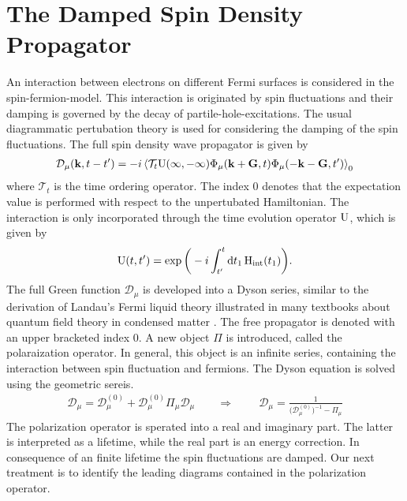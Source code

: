 \section{The Damped Spin Density Propagator}
\label{appsec:damped propagator}
%
%
An interaction between electrons on different Fermi surfaces is considered in the spin-fermion-model.
This interaction is originated by spin fluctuations and their damping is governed by the decay of partile-hole-excitations.
The usual diagrammatic pertubation theory is used for considering the damping of the spin fluctuations.
The full spin density wave propagator is given by
%
\begin{align}
	\mathcal{D}_{\mu}(\vb{k}, t-t') = -i \expval{\mathcal{T}_{t} \mathrm{U}(\infty, -\infty) \Phi_{\mu}(\vb{k}+\vb{G},t) \Phi_{\mu}(-\vb{k}-\vb{G},t')}_{0}
	\label{appeq:full spin density wave propagator}
\end{align}
%
where $\mathcal{T}_{t}$ is the time ordering operator.
The index $0$ denotes that the expectation value is performed with respect to the unpertubated Hamiltonian.
The interaction is only incorporated through the time evolution operator $\mathrm{U}$, which is given by
%
\begin{align}
	\mathrm{U}(t,t') = \exp\bigg(-i\int_{t'}^{t} \dd{t_{1}} \mathrm{H}_{\mathrm{int}}(t_{1})\bigg).
	\label{appeq:time evolution operator}
\end{align}
%
The full Green function $\mathcal{D}_{\mu}$ is developed into a Dyson series, similar to the derivation of Landau's Fermi liquid theory illustrated in many textbooks about quantum field theory in condensed matter \cite{Nolting}.
The free propagator is denoted with an upper bracketed index 0.
A new object $\Pi$ is introduced, called the polaraization operator.
In general, this object is an infinite series, containing the interaction between spin fluctuation and fermions.
The Dyson equation is solved using the geometric sereis.
%
\begin{align}
	\mathcal{D}_{\mu} = \mathcal{D}_{\mu}^{(0)} + \mathcal{D}_{\mu}^{(0)} \Pi_{\mu} \mathcal{D}_{\mu}
	\qquad \Rightarrow\ \qquad
	\mathcal{D}_{\mu} = \frac{1}{\big(\mathcal{D}_{\mu}^{(0)}\big)^{-1} - \Pi_{\mu}}
	\label{appeq:Dyson equation}
\end{align}
%
The polarization operator is sperated into a real and imaginary part.
The latter is interpreted as a lifetime, while the real part is an energy correction.
In consequence of an finite lifetime the spin fluctuations are damped.
Our next treatment is to identify the leading diagrams contained in the polarization operator.

